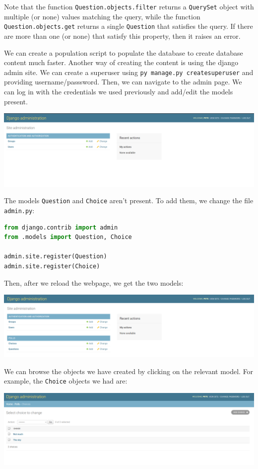 \documentclass[a4paper, openany]{memoir}
\begin{document}
    Note that the function \texttt{Question.objects.filter} returns a \texttt{QuerySet} object with multiple (or none) values matching the query, while the function \newline \texttt{Question.objects.get} returns a single \texttt{Question} that satisfies the query. If there are more than one (or none) that satisfy this property, then it raises an error.

    \noindent We can create a population script to populate the database to create database content much faster. Another way of creating the content is using the django admin site. We can create a superuser using \texttt{py manage.py createsuperuser} and providing username/passsword. Then, we can navigate to the admin page. We can log in with the credentials we used previously and add/edit the models present.
    \begin{center}
        \includegraphics[scale=0.3]{src/Django3.PNG}
    \end{center}
    The models \texttt{Question} and \texttt{Choice} aren't present. To add them, we change the file \texttt{admin.py}:
\begin{lstlisting}[language=python]
from django.contrib import admin
from .models import Question, Choice

admin.site.register(Question)
admin.site.register(Choice)
\end{lstlisting}
    Then, after we reload the webpage, we get the two models:
    \begin{center}
        \includegraphics[scale=0.3]{src/Django4.PNG}
    \end{center}
    We can browse the objects we have created by clicking on the relevant model. For example, the \texttt{Choice} objects we had are:
    \begin{center}
        \includegraphics[scale=0.3]{src/Django5.PNG}
    \end{center}
\end{document}
